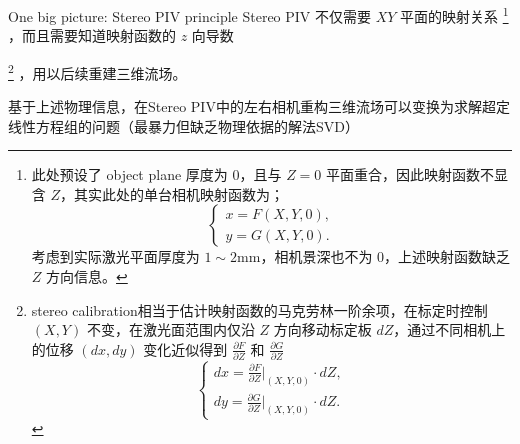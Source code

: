 \documentclass[10pt,xcolor={table,dvipsnames},t]{beamer}
\begin{document}
\begin{frame}{One big picture: Stereo PIV principle}
Stereo PIV 不仅需要 $XY$ 平面的映射关系
\footnote{此处预设了 object plane 厚度为 $0$，且与 $Z=0$ 平面重合，因此映射函数不显含 $Z$，其实此处的单台相机映射函数为；
$$
\begin{cases}
x = F(X, Y, 0),  \\
y = G(X, Y, 0).
\end{cases}
$$
考虑到实际激光平面厚度为 $1\sim 2 \mathrm{mm}$，相机景深也不为 $0$，上述映射函数缺乏 $Z$ 方向信息。}
，而且需要知道映射函数的 $z$ 向导数

\footnote{stereo calibration相当于估计映射函数的马克劳林一阶余项，在标定时控制 $(X,Y)$ 不变，在激光面范围内仅沿 $Z$ 方向移动标定板 $dZ$，通过不同相机上的位移 $(dx, dy)$ 变化近似得到 $\frac{ \partial F }{ \partial Z }$ 和 $\frac{ \partial G }{ \partial Z }$ 
$$
\begin{cases}
dx = \frac{ \partial F }{ \partial Z }|_{(X,Y,0)}\cdot dZ, \\
dy = \frac{ \partial G }{ \partial Z } |_{(X,Y,0)}\cdot dZ.
\end{cases}
$$}
，用以后续重建三维流场。

基于上述物理信息，在Stereo PIV中的左右相机重构三维流场可以变换为求解超定线性方程组的问题（最暴力但缺乏物理依据的解法SVD）
\end{frame}
\end{document}
